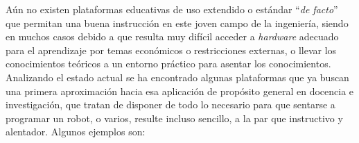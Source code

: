 Aún no existen plataformas educativas de uso extendido o estándar ``\textit{de facto}'' que permitan una buena instrucción en este joven campo de la ingeniería, siendo en muchos casos debido a que resulta muy difícil acceder a \textit{hardware} adecuado para el aprendizaje por temas económicos o restricciones externas, o llevar los conocimientos teóricos a un entorno práctico para asentar los conocimientos. Analizando el estado actual se ha encontrado algunas plataformas que ya buscan una primera aproximación hacia esa aplicación de propósito general en docencia e investigación, que tratan de disponer de todo lo necesario para que sentarse a programar un robot, o varios, resulte incluso sencillo, a la par que instructivo y alentador. Algunos ejemplos son:

\begin{itemize}


\end{itemize}
